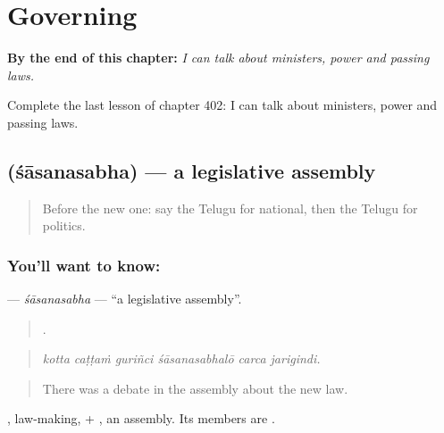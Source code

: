 
\chapter{Governing}
\label{ch:te-governing}

\begin{chapteropening}
\textbf{By the end of this chapter:} \emph{I can talk about ministers, power and passing laws.}

Complete the last lesson of chapter 402: I can talk about ministers, power and passing laws.
\end{chapteropening}

\section[\texorpdfstring{\te{శాసనసభ} (śāsanasabha)}{శాసనసభ (śāsanasabha)}]{ (śāsanasabha) — a legislative assembly}

\label{lesson:TE-C402-sasanasabha}



\begin{quote}
Before the new one: say the Telugu for national, then the Telugu for politics.
\end{quote}

\subsection*{You'll want to know: }
\textbf{} — \emph{śāsanasabha} — \textquotedblleft{}a legislative assembly\textquotedblright{}.

\begin{quote}
     .
\end{quote}

\begin{quote}
\emph{kotta caṭṭaṁ guriñci śāsanasabhalō carca jarigindi.}
\end{quote}

\begin{quote}
There was a debate in the assembly about the new law.
\end{quote}

, law-making, + , an assembly. Its members are .

